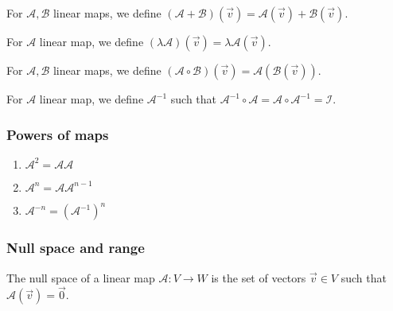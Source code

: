 \begin{theorem}[Addition]
    For $\mathcal{A}, \mathcal{B}$ linear maps, we define $(\mathcal{A} + \mathcal{B})(\vec{v}) = \mathcal{A}(\vec{v}) + \mathcal{B}(\vec{v})$.
\end{theorem}

\begin{theorem}
    For $\mathcal{A}$ linear map, we define $(\lambda \mathcal{A})(\vec{v}) = \lambda \mathcal{A}(\vec{v})$.
\end{theorem}

\begin{theorem}[Composition]
    For $\mathcal{A}, \mathcal{B}$ linear maps, we define $(\mathcal{A} \circ \mathcal{B})(\vec{v}) = \mathcal{A}(\mathcal{B}(\vec{v}))$.
\end{theorem}

\begin{theorem}[Inverse]
    For $\mathcal{A}$ linear map, we define $\mathcal{A}^{-1}$ such that $\mathcal{A}^{-1} \circ \mathcal{A} = \mathcal{A} \circ \mathcal{A}^{-1} = \mathcal{I}$.
\end{theorem}

\subsubsection{Powers of maps}
\begin{enumerate}
    \item $\mathcal{A}^2 = \mathcal{A}\mathcal{A}$
    \item $\mathcal{A}^n = \mathcal{A}\mathcal{A}^{n-1}$
    \item $\mathcal{A}^{-n} = (\mathcal{A}^{-1})^n$
\end{enumerate}

\subsubsection{Null space and range}
\begin{definition}
    The null space of a linear map $\mathcal{A}: V \to W$ is the set of vectors $\vec{v} \in V$ such that $\mathcal{A}(\vec{v}) = \vec{0}$.
\end{definition}

